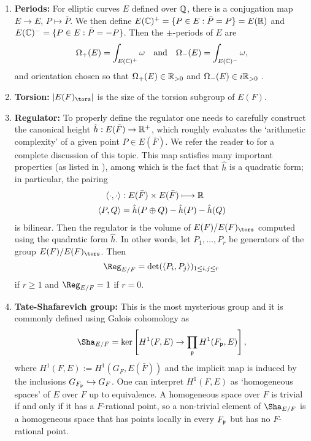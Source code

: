 \begin{enumerate}
    \item \textbf{Periods: } For elliptic curves $E$ defined over $\mathbb{Q}$, there is a conjugation map $E\to E$, $P\mapsto\bar{P}$. We then define $E(\mathbb{C})^+=\{P\in E:\bar{P}=P\}=E(\mathbb{R})$ and $E(\mathbb{C})^-=\{P\in E:\bar{P}=-P\}$. Then the $\pm$-periods of $E$ are 
    $$\Omega_+(E)=\int_{E(\mathbb{C})^+}\omega \quad\text{and}\quad\Omega_-(E)=\int_{E(\mathbb{C})^-}\omega,$$
    and orientation chosen so that $\Omega_+(E)\in\mathbb{R}_{>0}$ and $\Omega_-(E)\in i\mathbb{R}_{>0}$ .
    \item \textbf{Torsion:} $|E(F)_{\tors}|$ is the size of the torsion subgroup of $E(F)$.
    \item \textbf{Regulator:} To properly define the regulator one needs to carefully construct the canonical height $\hat{h}:E(\bar{F})\rightarrow\mathbb{R}^+$, which roughly evaluates the `arithmetic complexity' of a given point $P\in E(\bar{F})$. We refer the reader to \cite[Chapter VIII: \S4, \S5, \S6 and \S9]{S1} for a complete discussion of this topic. This map satisfies many important properties (as listed in \cite[Chapter VIII, Theorem 9.3]{S1}), among which is the fact that $\hat{h}$ is a quadratic form; in particular, the pairing
    \begin{align*}
        \langle\cdot,\cdot\rangle&:E(\bar{F})\times E(\bar{F})\longmapsto\mathbb{R}\\
        \langle P,Q\rangle&=\hat{h}(P\oplus Q)-\hat{h}(P)-\hat{h}(Q)
    \end{align*}
    is bilinear. Then the regulator is the volume of $E(F)/E(F)_{\tors}$ computed using the quadratic form $\hat{h}$. In other words, let $P_1,\ldots,P_r$ be generators of the group $E(F)/E(F)_{\tors}$. Then $$\Reg_{E/F}=\det(\langle P_i,P_j\rangle)_{1\leq i,j\leq r}$$
    if $r\geq1$ and $\Reg_{E/F}=1$ if $r=0$.
    \item \textbf{Tate-Shafarevich group:} This is the most mysterious group and it is commonly defined using Galois cohomology as
    $$\Sha_{E/F}=\ker\left[H^1(F,E)\rightarrow\prod_{\pp}H^1(F_\pp,E)\right],$$
    where $H^1(F,E):=H^1(G_F,E(\bar{F}))$ and the implicit map is induced by the inclusions $G_{F_{\mathfrak{p}}}\hookrightarrow G_F$. One can interpret $H^1(F,E)$ as `homogeneous spaces' of $E$ over $F$ up to equivalence. A homogeneous space over $F$ is trivial if and only if it has a $F$-rational point, so a non-trivial element of $\Sha_{E/F}$ is a homogeneous space that has points locally in every $F_{\mathfrak{p}}$ but has no $F$-rational point.


\end{enumerate}
